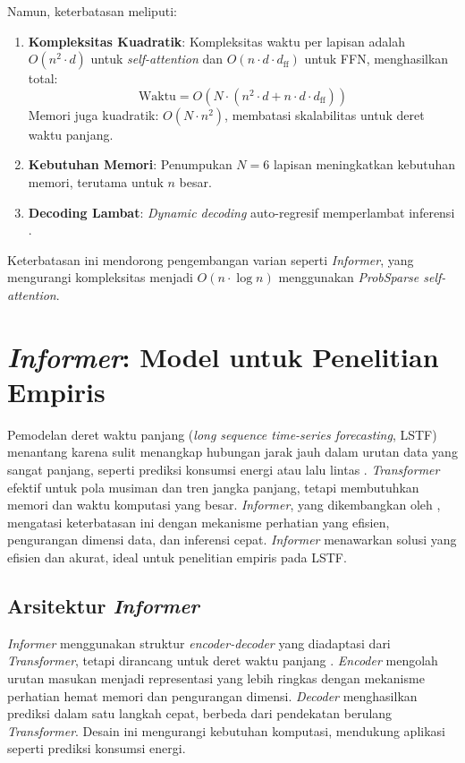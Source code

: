 Namun, keterbatasan meliputi:
\begin{enumerate}
    \item \textbf{Kompleksitas Kuadratik}: Kompleksitas waktu per lapisan adalah \( O(n^2 \cdot d) \) untuk \textit{self-attention} dan \( O(n \cdot d \cdot d_{\text{ff}}) \) untuk FFN, menghasilkan total:
    \begin{equation}
    \text{Waktu} = O(N \cdot (n^2 \cdot d + n \cdot d \cdot d_{\text{ff}}))
    \end{equation}
    Memori juga kuadratik: \( O(N \cdot n^2) \), membatasi skalabilitas untuk deret waktu panjang.
    \item \textbf{Kebutuhan Memori}: Penumpukan \( N=6 \) lapisan meningkatkan kebutuhan memori, terutama untuk \( n \) besar.
    \item \textbf{Decoding Lambat}: \textit{Dynamic decoding} auto-regresif memperlambat inferensi \citep{Zhou2021}.
\end{enumerate}
Keterbatasan ini mendorong pengembangan varian seperti \textit{Informer}, yang mengurangi kompleksitas menjadi \( O(n \cdot \log n) \) menggunakan \textit{ProbSparse self-attention}.

\section{\textit{Informer}: Model untuk Penelitian Empiris}
\label{sec:informer}

Pemodelan deret waktu panjang (\textit{long sequence time-series forecasting}, LSTF) menantang karena sulit menangkap hubungan jarak jauh dalam urutan data yang sangat panjang, seperti prediksi konsumsi energi atau lalu lintas \citep{Wu2021}. \textit{Transformer} \citep{Vaswani2017} efektif untuk pola musiman dan tren jangka panjang, tetapi membutuhkan memori dan waktu komputasi yang besar. \textit{Informer}, yang dikembangkan oleh \citet{Zhou2021}, mengatasi keterbatasan ini dengan mekanisme perhatian yang efisien, pengurangan dimensi data, dan inferensi cepat. \textit{Informer} menawarkan solusi yang efisien dan akurat, ideal untuk penelitian empiris pada LSTF.

\subsection{Arsitektur \textit{Informer}}
\label{sec:informer_architecture}

\textit{Informer} menggunakan struktur \textit{encoder-decoder} yang diadaptasi dari \textit{Transformer}, tetapi dirancang untuk deret waktu panjang \citep{Zhou2021}. \textit{Encoder} mengolah urutan masukan menjadi representasi yang lebih ringkas dengan mekanisme perhatian hemat memori dan pengurangan dimensi. \textit{Decoder} menghasilkan prediksi dalam satu langkah cepat, berbeda dari pendekatan berulang \textit{Transformer}. Desain ini mengurangi kebutuhan komputasi, mendukung aplikasi seperti prediksi konsumsi energi.

